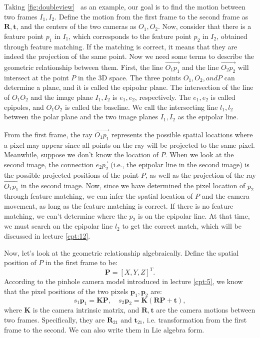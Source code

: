 Taking \autoref{fig:doubleview}~ as an example, our goal is to find the motion between two frames $I_{1}, I_{2}$. Define the motion from the first frame to the second frame as $\mathbf{R}, \mathbf{t}$, and the centers of the two cameras as $O_{1}, O_{2}$. Now, consider that there is a feature point $p_{1}$ in $I_{1}$, which corresponds to the feature point $p_{2}$ in $I_{2}$, obtained through feature matching. If the matching is correct, it means that they are indeed the projection of the same point. Now we need some terms to describe the geometric relationship between them. First, the line $\overrightarrow{O_{1}p_{1}}$ and the line $\overrightarrow{O_{2}p_{2}}$ will intersect at the point $P$ in the 3D space. The three points $O_{1}, O_{2}, and P$ can determine a plane, and it is called the epipolar plane. The intersection of the line of $O_{1}O_{2}$ and the image plane $I_{1}, I_{2}$ is $e_{1}, e_{2}$, respectively. The $e_{1}, e_{2}$ is called epipoles, and $O_{1}O_{2}$ is called the baseline. We call the intersecting line $l_{1},l_{2}$ between the polar plane and the two image planes $I_{1}, I_{2}$ as the epipolar line.

From the first frame, the ray $\overrightarrow{O_1 p_1}$ represents the possible spatial locations where a pixel may appear since all points on the ray will be projected to the same pixel. Meanwhile, suppose we don't know the location of $P$. When we look at the second image, the connection $\overrightarrow{e_2 p_2}$ (i.e., the epipolar line in the second image) is the possible projected positions of the point $P$, as well as the projection of the ray $\overrightarrow{O_1 p_1}$ in the second image. Now, since we have determined the pixel location of $p_2$ through feature matching, we can infer the spatial location of $P$ and the camera movement, as long as the feature matching is correct. If there is no feature matching, we can't determine where the $p_2$ is on the epipolar line. At that time, we must search on the epipolar line $l_2$ to get the correct match, which will be discussed in lecture \ref{cpt:12}.

Now, let's look at the geometric relationship algebraically. Define the spatial position of $P$ in the first frame to be:
\[
\mathbf{P}=[X,Y,Z]^T.
\]
According to the pinhole camera model introduced in lecture \ref{cpt:5}, we know that the pixel positions of the two pixels $\mathbf{p}_1,\mathbf{p}_2$ are:
\begin{equation}
\label{eq:7.1}
s_1 {\mathbf{p}_1} = \mathbf{KP},\quad s_2 \mathbf{p}_2 = \mathbf{K}\left( \mathbf{RP + t} \right),
\end{equation}
where $\mathbf{K}$ is the camera intrinsic  matrix, and $\mathbf{R}, \mathbf{t}$ are the camera motions between two frames. Specifically, they are $\mathbf{R}_{21}$ and $\mathbf{t}_{21}$, i.e. transformation from the first frame to the second. We can also write them in Lie algebra form.

